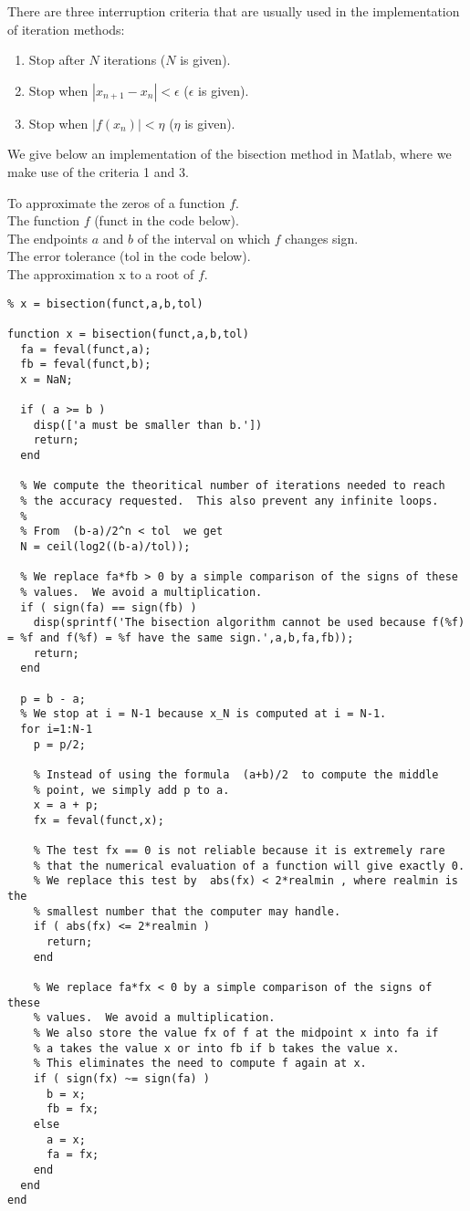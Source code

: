 There are three interruption criteria that are usually used in the
implementation of iteration methods:
\begin{enumerate}
\item  Stop after $N$ iterations ($N$ is given).
\item  Stop when $|x_{n+1}-x_n|<\epsilon$ ($\epsilon$ is given).
\item  Stop when $|f(x_n)|<\eta$ ($\eta$ is given).
\end{enumerate}

We give below an implementation of the bisection method in Matlab,
where we make use of the criteria 1 and 3.

\begin{code}[Bisection]
To approximate the zeros of a function $f$.\\
 The function $f$ (funct in the code below).\\
The endpoints $a$ and $b$ of the interval on which $f$ changes sign.\\
The error tolerance (tol in the code below).\\
 The approximation x to a root of $f$.
\small
\begin{verbatim}
% x = bisection(funct,a,b,tol)

function x = bisection(funct,a,b,tol)
  fa = feval(funct,a);
  fb = feval(funct,b);
  x = NaN;

  if ( a >= b )
    disp(['a must be smaller than b.'])
    return;
  end

  % We compute the theoritical number of iterations needed to reach
  % the accuracy requested.  This also prevent any infinite loops.
  %
  % From  (b-a)/2^n < tol  we get
  N = ceil(log2((b-a)/tol));

  % We replace fa*fb > 0 by a simple comparison of the signs of these
  % values.  We avoid a multiplication.
  if ( sign(fa) == sign(fb) )
    disp(sprintf('The bisection algorithm cannot be used because f(%f)
= %f and f(%f) = %f have the same sign.',a,b,fa,fb));
    return;
  end

  p = b - a;
  % We stop at i = N-1 because x_N is computed at i = N-1.
  for i=1:N-1
    p = p/2;

    % Instead of using the formula  (a+b)/2  to compute the middle
    % point, we simply add p to a.
    x = a + p;
    fx = feval(funct,x);

    % The test fx == 0 is not reliable because it is extremely rare
    % that the numerical evaluation of a function will give exactly 0.
    % We replace this test by  abs(fx) < 2*realmin , where realmin is the
    % smallest number that the computer may handle.
    if ( abs(fx) <= 2*realmin )
      return;
    end
       
    % We replace fa*fx < 0 by a simple comparison of the signs of these
    % values.  We avoid a multiplication.
    % We also store the value fx of f at the midpoint x into fa if
    % a takes the value x or into fb if b takes the value x.
    % This eliminates the need to compute f again at x.
    if ( sign(fx) ~= sign(fa) )
      b = x;
      fb = fx;
    else
      a = x;
      fa = fx;
    end
  end
end
\end{verbatim}
\end{code}

